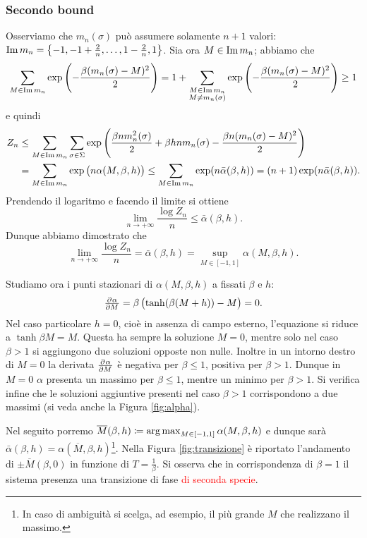 \subsubsection{Secondo bound}
Osserviamo che $ m_n(\sigma) $ può assumere solamente $ n+1 $ valori: $ \operatorname{Im} m_n = \left\{ -1, -1 + \frac{2}{n}, \ldots, 1-\frac{2}{n}, 1 \right\} $. Sia ora $ M \in \operatorname{Im} m_n $; abbiamo che
\[ \sum_{M\in \operatorname{Im} m_n} \exp\left( -\frac{\beta(m_n(\sigma)-M)^2}{2} \right) = 1 + \sum_{\substack{M \in \operatorname{Im} m_n \\ M \neq m_n(\sigma)}} \exp\left( -\frac{\beta(m_n(\sigma)-M)^2}{2} \right) \geq 1 \]
e quindi
\begin{align*}
    Z_n & \leq \sum_{M\in \operatorname{Im} m_n} \sum_{\sigma \in \Sigma} \exp\left( \frac{\beta n m_n^2(\sigma)}{2} + \beta h n m_n(\sigma) - \frac{\beta n (m_n(\sigma)-M)^2}{2}\right)     \\
        & = \sum_{M\in \operatorname{Im} m_n} \exp\left( n \alpha(M, \beta, h) \right)
         \leq \sum_{M\in \operatorname{Im} m_n} \exp(n \bar{\alpha}(\beta, h)) = (n+1) \exp(n \bar{\alpha}(\beta, h)).
\end{align*}
Prendendo il logaritmo e facendo il limite si ottiene
\[  \lim_{n \to +\infty} \frac{\log Z_n}{n} \leq \bar{\alpha}(\beta,h). \]
Dunque abbiamo dimostrato che
\[ \lim_{n \to +\infty}\frac{\log Z_n}{n} = \bar{\alpha}(\beta,h) = \sup_{M\in[-1,1]} \alpha(M, \beta, h). \]

Studiamo ora i punti stazionari di $ \alpha(M, \beta, h) $ a fissati $ \beta $ e $ h $:
\begin{equation}\label{eq:mbar}
    \pd{\alpha}{M} = \beta \left( \tanh(\beta (M+h)) - M \right) = 0.
\end{equation}
Nel caso particolare $ h = 0 $, cioè in assenza di campo esterno, l'equazione si riduce a $ \tanh{\beta M} = M $. Questa ha sempre la soluzione $ M = 0 $, mentre solo nel caso $ \beta > 1 $ si aggiungono due soluzioni opposte non nulle. Inoltre in un intorno destro di $ M = 0 $ la derivata $ \pd{\alpha}{M} $ è negativa per $ \beta \leq 1 $, positiva per $ \beta > 1 $. Dunque in $ M = 0 $ $ \alpha $ presenta un massimo per $ \beta \leq 1 $, mentre un minimo per $ \beta > 1 $. Si verifica infine che le soluzioni aggiuntive presenti nel caso $ \beta > 1 $ corrispondono a due massimi (si veda anche la Figura \ref{fig:alpha}).

Nel seguito porremo $ \overline{M}(\beta,h) \coloneqq \operatorname*{arg\, max}_{M\in[-1,1]} \alpha(M,\beta,h) $ e dunque sarà $ \bar{\alpha}(\beta, h) = \alpha(\overline{M}, \beta, h) $\footnote{In caso di ambiguità si scelga, ad esempio, il più grande $ M $ che realizzano il massimo.}. Nella Figura \ref{fig:transizione} è riportato l'andamento di $ \pm \overline{M}(\beta, 0) $ in funzione di $ T=\frac{1}{\beta} $. Si osserva che in corrispondenza di $ \beta = 1 $ il sistema presenza una transizione di fase \textcolor{red}{di seconda specie}.

